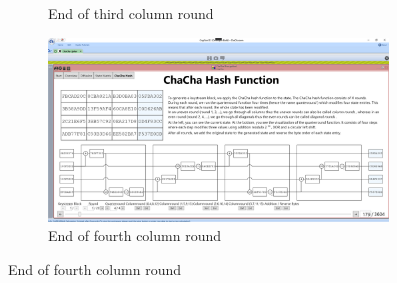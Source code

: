 \begin{figure}
\begin{subfigure}{0.5\textwidth}
  \caption{End of third column round}
  \label{fig:chachahash.cr.3}
\end{subfigure}%
\begin{subfigure}{0.5\textwidth}
  \centering
  \includegraphics[width=0.99\textwidth]{figures/chachahash/chachahash-cr4-end}
  \caption{End of fourth column round}
  \label{fig:chachahash.cr.4}
\end{subfigure}


\end{figure}
